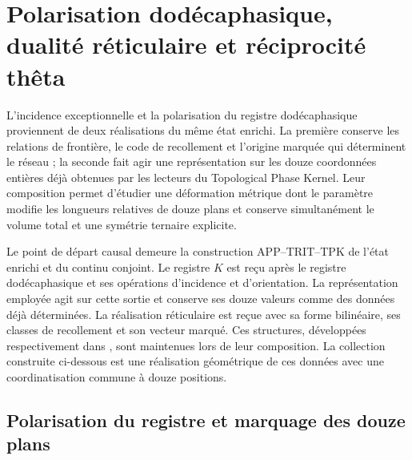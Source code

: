 \section{Polarisation dodécaphasique, dualité réticulaire et réciprocité thêta}
\label{sec:leech-dualidad}

L'incidence exceptionnelle et la polarisation du registre dodécaphasique proviennent de deux réalisations du même état enrichi. La première conserve les relations de frontière, le code de recollement et l'origine marquée qui déterminent le réseau ; la seconde fait agir une représentation sur les douze coordonnées entières déjà obtenues par les lecteurs du Topological Phase Kernel. Leur composition permet d'étudier une déformation métrique dont le paramètre modifie les longueurs relatives de douze plans et conserve simultanément le volume total et une symétrie ternaire explicite.

Le point de départ causal demeure la construction APP--TRIT--TPK de l'état enrichi et du continu conjoint. Le registre \(K\) est reçu après le registre dodécaphasique et ses opérations d'incidence et d'orientation. La représentation employée agit sur cette sortie et conserve ses douze valeurs comme des données déjà déterminées. La réalisation réticulaire est reçue avec sa forme bilinéaire, ses classes de recollement et son vecteur marqué. Ces structures, développées respectivement dans \cite{hmtX,HMT-IV}, sont maintenues lors de leur composition. La collection construite ci-dessous est une réalisation géométrique de ces données avec une coordinatisation commune à douze positions.

\subsection{Polarisation du registre et marquage des douze plans}
\label{subsec:leech-polarizacion}

